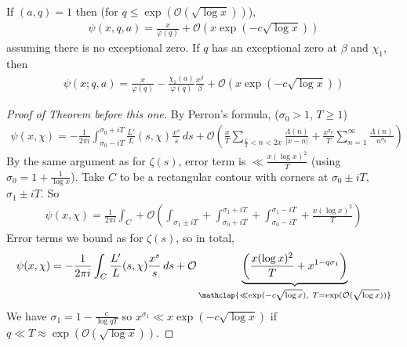 \documentclass{article}
\newcommand{\1}{\mathbbm{1}}
\newcommand{\bigO}{\mathcal{O}}
\begin{document}
\begin{cor}
  If $(a,q) = 1$ then (for $q \leq \exp(\bigO(\sqrt{\log x}))$),
  \begin{align*}
    \psi(x,q,a) = \frac{x}{\varphi(q)} + \bigO(x \exp(-c \sqrt{\log x}))
  \end{align*}
  assuming there is no exceptional zero.
  If $q$ has an exceptional zero at $\beta$ and $\chi_1$, then
  \begin{align*}
    \psi(x;q,a) = \frac{x}{\varphi(q)} - \frac{\chi_1(a)}{\varphi(q)} \frac{x^\beta}{\beta} + \bigO(x \exp(-c \sqrt{\log x}))
  \end{align*}
\end{cor}
\begin{proof}[Proof of Theorem before this one]
  By Perron's formula, ($\sigma_0 > 1$, $T \geq 1$)
  \begin{align*}
    \psi(x,\chi) = -\frac{1}{2\pi i} \int_{\sigma_0 - iT}^{\sigma_0 + iT} \frac{L'}{L}(s,\chi) \frac{x^s}{s} \,ds + \bigO\left(\frac{x}{T} \sum_{\frac{x}{2} < n < 2x} \frac{\Lambda(n)}{|x-n|} + \frac{x^{\sigma_0}}{T} \sum_{n=1}^\infty \frac{\Lambda(n)}{n^{\sigma_0}}\right)
  \end{align*}
  By the same argument as for $\zeta(s)$, error term is $\ll \frac{x (\log x)^2}{T}$ (using $\sigma_0 = 1 + \frac{1}{\log x}$).
  Take $C$ to be a rectangular contour with corners at $\sigma_0 \pm iT$, $\sigma_1 \pm iT$.
  So
  \begin{align*}
    \psi(x,\chi) = \frac{1}{2\pi i} \int_C + \bigO\left(\int_{\sigma_1 \pm iT} + \int_{\sigma_0+iT}^{\sigma_1 + iT} + \int_{\sigma_0 - iT}^{\sigma_1-iT} + \frac{x(\log x)^2}{T}\right)
  \end{align*}
  Error terms we bound as for $\zeta(s)$, so in total,
  \begin{align*}
    \psi(x,\chi) = -\frac{1}{2 \pi i} \int_C \frac{L'}{L} (s,\chi) \frac{x^s}{s} \,ds + \bigO\underbrace{\left(\frac{x (\log x)^2 }{T} + x^{1-q \sigma_1}\right)}_{\mathclap{\ll \exp(- c \sqrt{\log x}),\ T = \exp(\bigO(\sqrt{\log x}))}}
  \end{align*}
  We have $\sigma_1 = 1 - \frac{c}{\log q T}$ so $x^{\sigma_1} \ll x \exp(-c \sqrt{\log x})$ if $q \ll T \approx \exp(\bigO(\sqrt{\log x}))$.


\end{proof}
\end{document}

